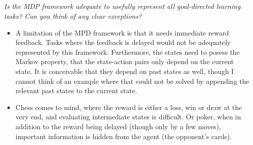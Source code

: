 \documentclass{article}
\begin{document}
\subsection{}
\textit{Is the MDP framework adequate to usefully represent all goal-directed learning tasks? Can you think of any clear exceptions?}
\begin{itemize}
\item A limitation of the MPD framework is that it needs immediate reward feedback. Tasks where the feedback is delayed would not be adequately represented by this framework. Furthermore, the states need to posess the Markov property, that the state-action pairs only depend on the current state. It is conceivable that they depend on past states as well, though I cannot think of an example where that could not be solved by appending the relevant past states to the current state.
\item Chess comes to mind, where the reward is either a loss, win or draw at the very end, and evaluating intermediate states is difficult. Or poker, when in addition to the reward being delayed (though only by a few moves), important information is hidden from the agent (the opponent's cards).
\end{itemize}
\end{document}
